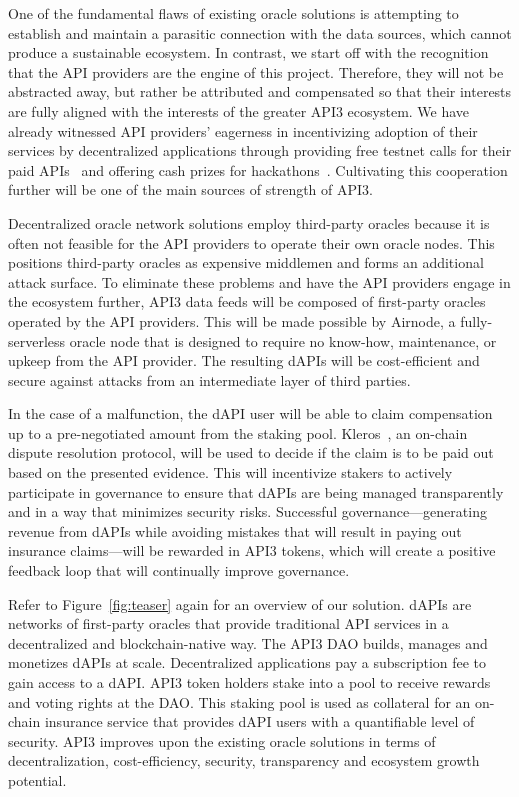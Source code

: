 \documentclass[11pt]{article}
\begin{document}
One of the fundamental flaws of existing oracle solutions is attempting to establish and maintain a parasitic connection with the data sources, which cannot produce a sustainable ecosystem.
In contrast, we start off with the recognition that the API providers are the engine of this project.
Therefore, they will not be abstracted away, but rather be attributed and compensated so that their interests are fully aligned with the interests of the greater API3 ecosystem.
We have already witnessed API providers’ eagerness in incentivizing adoption of their services by decentralized applications through providing free testnet calls for their paid APIs~\cite{honeycomb.market} and offering cash prizes for hackathons~\cite{honeycomb-hackathon}.
Cultivating this cooperation further will be one of the main sources of strength of API3.

Decentralized oracle network solutions employ third-party oracles because it is often not feasible for the API providers to operate their own oracle nodes.
This positions third-party oracles as expensive middlemen and forms an additional attack surface.
To eliminate these problems and have the API providers engage in the ecosystem further, API3 data feeds will be composed of first-party oracles operated by the API providers.
This will be made possible by Airnode, a fully-serverless oracle node that is designed to require no know-how, maintenance, or upkeep from the API provider.
The resulting dAPIs will be cost-efficient and secure against attacks from an intermediate layer of third parties.

In the case of a malfunction, the dAPI user will be able to claim compensation up to a pre-negotiated amount from the staking pool.
Kleros~\cite{kleros:2019}, an on-chain dispute resolution protocol, will be used to decide if the claim is to be paid out based on the presented evidence.
This will incentivize stakers to actively participate in governance to ensure that dAPIs are being managed transparently and in a way that minimizes security risks.
Successful governance---generating revenue from dAPIs while avoiding mistakes that will result in paying out insurance claims---will be rewarded in API3 tokens, which will create a positive feedback loop that will continually improve governance.

Refer to Figure~\ref{fig:teaser} again for an overview of our solution.
dAPIs are networks of first-party oracles that provide traditional API services in a decentralized and blockchain-native way.
The API3 DAO builds, manages and monetizes dAPIs at scale.
Decentralized applications pay a subscription fee to gain access to a dAPI.
API3 token holders stake into a pool to receive rewards and voting rights at the DAO.
This staking pool is used as collateral for an on-chain insurance service that provides dAPI users with a quantifiable level of security.
API3 improves upon the existing oracle solutions in terms of decentralization, cost-efficiency, security, transparency and ecosystem growth potential.
\end{document}
